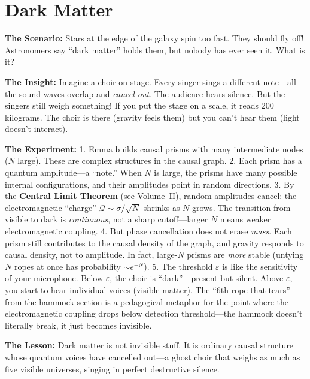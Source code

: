 \documentclass[11pt, a4paper, openany]{book}
\begin{document}
\section{Dark Matter}
\begin{thoughtexp}
\textbf{The Scenario:} Stars at the edge of the galaxy spin too fast. They should fly off! Astronomers say ``dark matter'' holds them, but nobody has ever seen it. What is it?

\textbf{The Insight:} Imagine a choir on stage. Every singer sings a different note---all the sound waves overlap and \emph{cancel out}. The audience hears silence. But the singers still weigh something! If you put the stage on a scale, it reads 200 kilograms. The choir is there (gravity feels them) but you can't hear them (light doesn't interact).

\textbf{The Experiment:}
1. Emma builds causal prisms with many intermediate nodes ($N$ large). These are complex structures in the causal graph.
2. Each prism has a quantum amplitude---a ``note.'' When $N$ is large, the prisms have many possible internal configurations, and their amplitudes point in random directions.
3. By the \textbf{Central Limit Theorem} (see Volume~II), random amplitudes cancel: the electromagnetic ``charge'' $\mathcal{Q} \sim \sigma / \sqrt{N}$ shrinks as $N$ grows. The transition from visible to dark is \emph{continuous}, not a sharp cutoff---larger $N$ means weaker electromagnetic coupling.
4. But phase cancellation does not erase \emph{mass}. Each prism still contributes to the causal density of the graph, and gravity responds to causal density, not to amplitude. In fact, large-$N$ prisms are \emph{more} stable (untying $N$ ropes at once has probability $\sim e^{-N}$).
5. The threshold $\varepsilon$ is like the sensitivity of your microphone. Below $\varepsilon$, the choir is ``dark''---present but silent. Above $\varepsilon$, you start to hear individual voices (visible matter). The ``6th rope that tears'' from the hammock section is a pedagogical metaphor for the point where the electromagnetic coupling drops below detection threshold---the hammock doesn't literally break, it just becomes invisible.

\textbf{The Lesson:} Dark matter is not invisible stuff. It is ordinary causal structure whose quantum voices have cancelled out---a ghost choir that weighs as much as five visible universes, singing in perfect destructive silence.
\end{thoughtexp}
\end{document}
